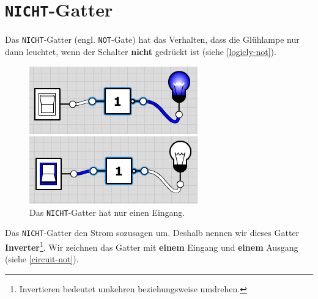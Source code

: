 \section{\texttt{NICHT}-Gatter}

Das \texttt{NICHT}-Gatter (engl. \texttt{NOT}-Gate) hat das Verhalten, dass die Glühlampe nur dann leuchtet, wenn der Schalter \textbf{nicht} gedrückt ist (siehe \autoref{logicly-not}).

\begin{figure}[H]
\centering
\begin{minipage}{0.25\textwidth}
\includegraphics[width=\textwidth]{./not/not_off}
\end{minipage}
\begin{minipage}{0.25\textwidth}
\includegraphics[width=\textwidth]{./not/not_on}
\end{minipage}
\caption{Das \texttt{NICHT}-Gatter hat nur einen Eingang.}
\label{logicly-not}
\end{figure}

Das \texttt{NICHT}-Gatter  den Strom sozusagen um. Deshalb nennen wir dieses Gatter \textbf{Inverter}\footnote{Invertieren bedeutet umkehren beziehungsweise umdrehen.}. Wir zeichnen das Gatter mit \textbf{einem} Eingang und \textbf{einem} Ausgang (siehe \autoref{circuit-not}).

